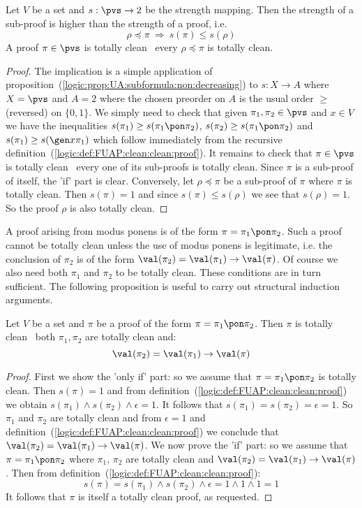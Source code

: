 \begin{prop}\label{logic:prop:FUAP:clean:sub:proof}
Let $V$ be a set and $s:\pvs\to 2$ be the strength mapping. Then the
strength of a sub-proof is higher than the strength of a proof, i.e.
    \[
    \rho\preceq\pi\ \Rightarrow\ s(\pi)\leq
    s(\rho)
    \]
A proof $\pi\in\pvs$ is totally clean \ifand\ every $\rho\preceq\pi$
is totally clean.
\end{prop}
\begin{proof}
The implication is a simple application of
proposition~(\ref{logic:prop:UA:subformula:non:decreasing}) to
$s:X\to A$ where $X=\pvs$ and $A=2$ where the chosen preorder on $A$
is the usual order $\geq$ (reversed) on $\{0,1\}$. We simply need to
check that given $\pi_{1},\pi_{2}\in\pvs$ and $x\in V$ we have the
inequalities $s(\pi_{1})\geq s(\pi_{1}\pon\pi_{2})$, $s(\pi_{2})\geq
s(\pi_{1}\pon\pi_{2})$ and $s(\pi_{1})\geq s(\gen x\pi_{1})$ which
follow immediately from the recursive
definition~(\ref{logic:def:FUAP:clean:clean:proof}). It remains to
check that $\pi\in\pvs$ is totally clean \ifand\ every one of its
sub-proofs is totally clean. Since $\pi$ is a sub-proof of itself,
the 'if' part is clear. Conversely, let $\rho\preceq\pi$ be a
sub-proof of $\pi$ where $\pi$ is totally clean. Then $s(\pi)=1$ and
since $s(\pi)\leq s(\rho)$ we see that $s(\rho)=1$. So the proof
$\rho$ is also totally clean.
\end{proof}

A proof arising from modus ponens is of the form
$\pi=\pi_{1}\pon\pi_{2}$. Such a proof cannot be totally clean
unless the use of modus ponens is legitimate, i.e. the conclusion of
$\pi_{2}$ is of the form $\val(\pi_{2})=\val(\pi_{1})\to\val(\pi)$.
Of course we also need both $\pi_{1}$ and $\pi_{2}$ to be totally
clean. These conditions are in turn sufficient. The following
proposition is useful to carry out structural induction arguments.

\begin{prop}\label{logic:prop:FUAP:clean:modus:ponens}
Let $V$ be a set and $\pi$ be a proof of the form
$\pi=\pi_{1}\pon\pi_{2}$. Then $\pi$ is totally clean \ifand\ both
$\pi_{1},\pi_{2}$ are totally clean and:
    \[
    \val(\pi_{2})=\val(\pi_{1})\to\val(\pi)
    \]
\end{prop}
\begin{proof}
First we show the 'only if' part: so we assume that
$\pi=\pi_{1}\pon\pi_{2}$ is totally clean. Then $s(\pi)=1$ and from
definition~(\ref{logic:def:FUAP:clean:clean:proof}) we obtain
$s(\pi_{1})\land s(\pi_{2})\land\epsilon=1$. It follows that
$s(\pi_{1})=s(\pi_{2})=\epsilon=1$. So $\pi_{1}$ and $\pi_{2}$ are
totally clean and from $\epsilon=1$ and
definition~(\ref{logic:def:FUAP:clean:clean:proof}) we conclude that
$\val(\pi_{2})=\val(\pi_{1})\to\val(\pi)$. We now prove the 'if'
part: so we assume that $\pi=\pi_{1}\pon\pi_{2}$  where $\pi_{1}$,
$\pi_{2}$ are totally clean and
$\val(\pi_{2})=\val(\pi_{1})\to\val(\pi)$. Then from
definition~(\ref{logic:def:FUAP:clean:clean:proof}):
    \[
    s(\pi)=s(\pi_{1})\land s(\pi_{2})\land\epsilon=1\land 1\land 1
    =1
    \]
It follows that $\pi$ is itself a totally clean proof, as requested.
\end{proof}

